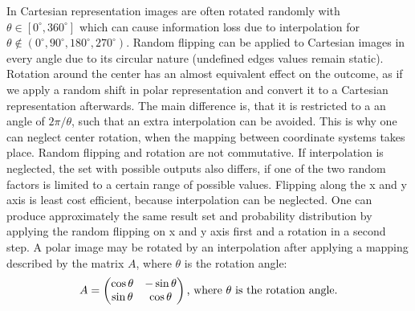 In Cartesian representation images are often rotated randomly \cite{BenCohen.2018, Devalla.2018, Kuwayama.2019, hussain.2018, Kihara.2019, Gessert.2018, Gessert.2019} with \( \theta \in [ 0^{\circ} , 360^{\circ} ] \) which can cause information loss due to \gls{interpolation} for \( \theta \notin ( 0^{\circ}, 90^{\circ}, 180^{\circ}, 270^{\circ} ) \). Random flipping \cite{Devalla.2018} can be applied to Cartesian images in every angle due to its circular nature (undefined edges values remain static). Rotation around the center has an almost equivalent effect on the outcome, as if we apply a random shift in polar representation and convert it to a Cartesian representation afterwards. The main difference is, that it is restricted to a an angle of \( 2 \pi / \theta \), such that an extra \gls{interpolation} can be avoided. This is why one can neglect center rotation, when the mapping between coordinate systems takes place. Random flipping and rotation are not commutative. If \gls{interpolation} is neglected, the set with possible outputs also differs, if one of the two random factors is limited to a certain range of possible values. Flipping along the x and y axis is least cost efficient, because \gls{interpolation} can be neglected. One can produce approximately the same result set and probability distribution by applying the random flipping on x and y axis first and a rotation in a second step. A polar image may be rotated by an \gls{interpolation} after applying a mapping described by the matrix \( A \), where \( \theta \) is the rotation angle:
\begin{equation}
    A = 
    \begin{pmatrix}
    \cos{\theta} & -\sin{\theta} \\
    \sin{\theta} & \cos{\theta}
    \end{pmatrix}
    \textnormal{, where } \theta \textnormal{ is the rotation angle.}
\end{equation}

